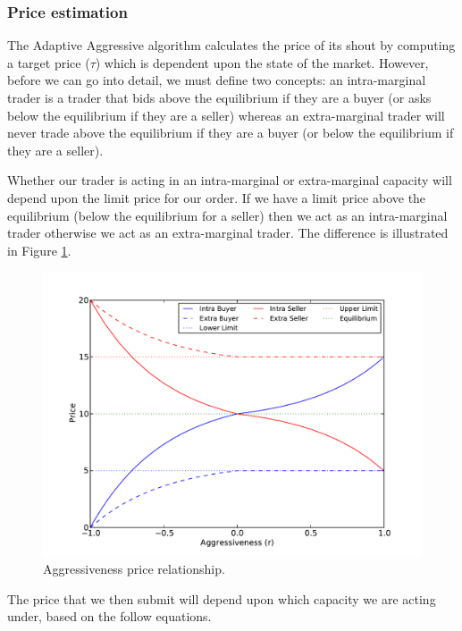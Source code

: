 \documentclass[preprint]{acm_proc_article-sp} %
\begin{document}
\subsubsection{Price estimation} \label{sec:AA_price_estimation}
The Adaptive Aggressive algorithm calculates the price of its shout by
computing a target price ($\tau$) which is dependent upon
the state of the market. However, before we can go into detail, we must define
two concepts: an intra-marginal trader is a trader that bids above the
equilibrium if they are a buyer (or asks below the equilibrium if they are a
seller) whereas an extra-marginal trader will never trade above the
equilibrium if they are a buyer (or below the equilibrium if they are a
seller).

Whether our trader is acting in an intra-marginal or extra-marginal capacity
will depend upon the limit price for our order. If we have a limit price above
the equilibrium (below the equilibrium for a seller) then we act as an
intra-marginal trader otherwise we act as an extra-marginal trader. The
difference is illustrated in Figure \ref{fig:r_price}.

\begin{figure}[H]
\centering
\includegraphics[width=\columnwidth]{graphs_and_stats/graph_r.pdf}
\caption{Aggressiveness price relationship.}
\label{fig:r_price}
\end{figure}

The price that we then submit will depend upon which capacity we are acting
under, based on the follow equations.
\end{document}

